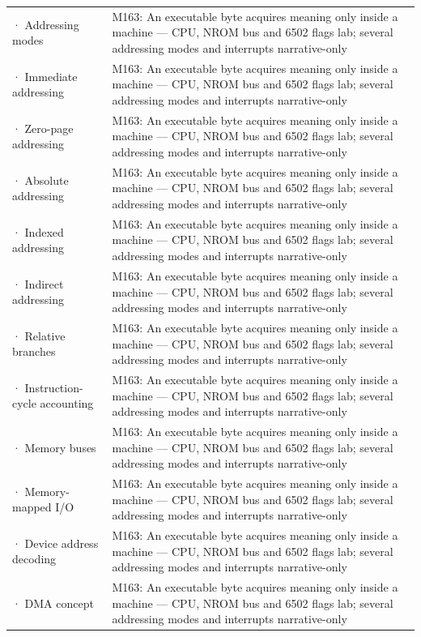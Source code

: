 {\begin{longtable}[]{@{}
  >{\raggedright\arraybackslash}p{}
  >{\raggedright\arraybackslash}p{}@{}}
2709 · Addressing modes & M163: An executable byte acquires meaning only inside a machine --- CPU, NROM bus and 6502 flags lab; several addressing modes and interrupts narrative-only \\
2710 · Immediate addressing & M163: An executable byte acquires meaning only inside a machine --- CPU, NROM bus and 6502 flags lab; several addressing modes and interrupts narrative-only \\
2711 · Zero-page addressing & M163: An executable byte acquires meaning only inside a machine --- CPU, NROM bus and 6502 flags lab; several addressing modes and interrupts narrative-only \\
2712 · Absolute addressing & M163: An executable byte acquires meaning only inside a machine --- CPU, NROM bus and 6502 flags lab; several addressing modes and interrupts narrative-only \\
2713 · Indexed addressing & M163: An executable byte acquires meaning only inside a machine --- CPU, NROM bus and 6502 flags lab; several addressing modes and interrupts narrative-only \\
2714 · Indirect addressing & M163: An executable byte acquires meaning only inside a machine --- CPU, NROM bus and 6502 flags lab; several addressing modes and interrupts narrative-only \\
2715 · Relative branches & M163: An executable byte acquires meaning only inside a machine --- CPU, NROM bus and 6502 flags lab; several addressing modes and interrupts narrative-only \\
2716 · Instruction-cycle accounting & M163: An executable byte acquires meaning only inside a machine --- CPU, NROM bus and 6502 flags lab; several addressing modes and interrupts narrative-only \\
2717 · Memory buses & M163: An executable byte acquires meaning only inside a machine --- CPU, NROM bus and 6502 flags lab; several addressing modes and interrupts narrative-only \\
2718 · Memory-mapped I/O & M163: An executable byte acquires meaning only inside a machine --- CPU, NROM bus and 6502 flags lab; several addressing modes and interrupts narrative-only \\
2719 · Device address decoding & M163: An executable byte acquires meaning only inside a machine --- CPU, NROM bus and 6502 flags lab; several addressing modes and interrupts narrative-only \\
2720 · DMA concept & M163: An executable byte acquires meaning only inside a machine --- CPU, NROM bus and 6502 flags lab; several addressing modes and interrupts narrative-only \\

\end{longtable}}
